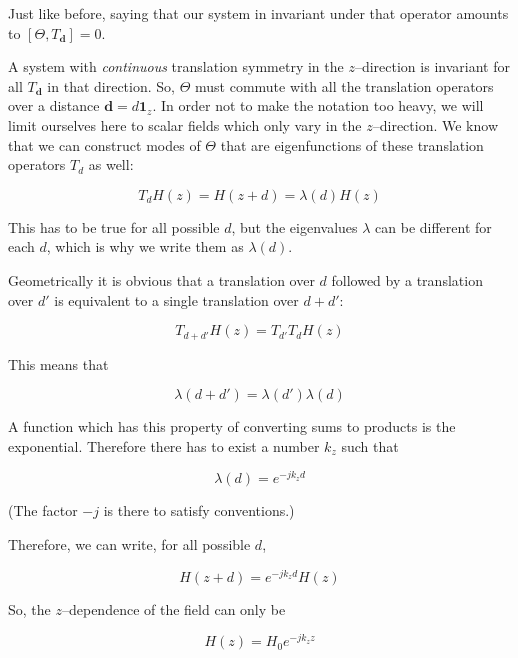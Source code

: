 Just like before, saying that our system in invariant under that operator amounts to $[\Theta, T_{\mathbf d}] = 0$.

A system with \emph{continuous} translation symmetry in the $z$--direction is invariant for all $T_{\mathbf d}$ in that direction. So, $\Theta$ must commute with all the translation operators over a distance ${\mathbf d} = d {\mathbf 1}_z$. In order not to make the notation too heavy, we will limit ourselves here to scalar fields which only vary in the $z$--direction.  We know that we can construct modes of $\Theta$ that are eigenfunctions of these translation operators $T_d$ as well:

\begin{equation}
T_d H(z) = H(z + d) = \lambda(d) H(z)
\end{equation} 

This has to be true for all possible $d$, but the eigenvalues $\lambda$ can be different for each $d$, which is why we write them as $\lambda(d)$. 

Geometrically it is obvious that a translation over $d$ followed by a translation over $d'$ is equivalent to a single translation over $d+d'$:

\begin{equation}
T_{d+d'}H(z) = T_{d'}T_{d}H(z)
\end{equation} 

This means that

\begin{equation}
\lambda(d + d')=\lambda(d')\lambda(d)
\end{equation} 

A function which has this property of converting sums to products is the exponential. Therefore there has to exist a number $k_z$ such that

\begin{equation}
\lambda(d) = e^{-j k_z d}
\end{equation} 

(The factor $-j$ is there to satisfy conventions.)

Therefore, we can write, for all possible $d$, 

\begin{equation}
H(z + d) = e^{-j k_z d}H(z) \label{eq-bloch-degenerate}
\end{equation} 

So, the $z$--dependence of the field can only be

\begin{equation}
H(z) = H_0 e^{-j k_z z}
\end{equation} 

